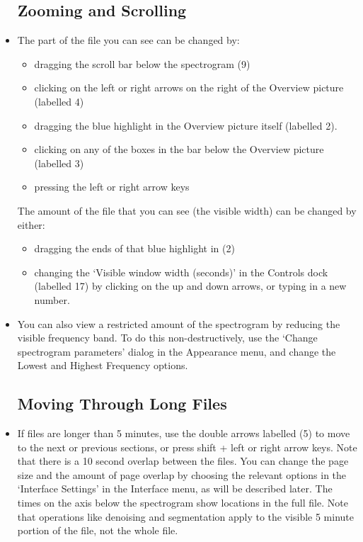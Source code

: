 \documentclass{article}
\begin{document}
\begin{itemize}
\subsection{Zooming and Scrolling}

\item The part of the file you can see can be changed by:
	\begin{itemize}
	\item dragging the scroll bar below the spectrogram (9)
	\item clicking on the left or right arrows on the right of the Overview picture (labelled 4)
	\item dragging the blue highlight in the Overview picture itself (labelled 2). 
	\item clicking on any of the boxes in the bar below the Overview picture (labelled 3)
	\item pressing the left or right arrow keys
	\end{itemize}
	The amount of the file that you can see (the visible width) can be changed by either: 
	\begin{itemize}
	\item dragging the ends of that blue highlight in (2)
	\item changing the `Visible window width (seconds)' in the Controls dock (labelled 17) by clicking on the up and down arrows, or typing in a new number.
	\end{itemize}

\item You can also view a restricted amount of the spectrogram by reducing the visible frequency band. To do this non-destructively, use the `Change spectrogram parameters' dialog in the Appearance menu, and change the Lowest and Highest Frequency options.

\subsection{Moving Through Long Files}

\item If files are longer than 5 minutes, use the double arrows labelled (5) to move to the next or previous sections, or press shift + left or right arrow keys. Note that there is a 10 second overlap between the files. You can change the page size and the amount of page overlap by choosing the relevant options in the `Interface Settings' in the Interface menu, as will be described later. The times on the axis below the spectrogram show locations in the full file. Note that operations like denoising and segmentation apply to the visible 5 minute portion of the file, not the whole file. 


\end{itemize}
\end{document}
